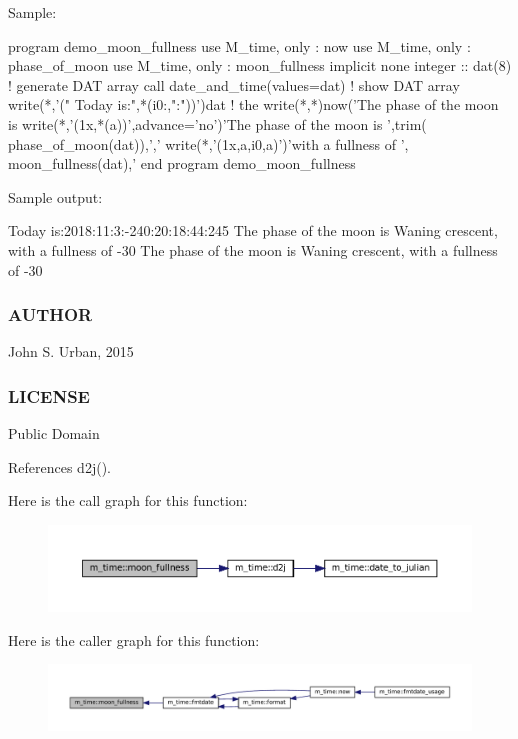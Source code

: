 \begin{DoxyVerb}Sample:

 program demo_moon_fullness
 use M_time, only : now
 use M_time, only : phase_of_moon
 use M_time, only : moon_fullness
 implicit none
 integer             :: dat(8)
    ! generate DAT array
    call date_and_time(values=dat)
    ! show DAT array
    write(*,'(" Today is:",*(i0:,":"))')dat
    ! the %
    write(*,*)now('The phase of the moon is %
    write(*,'(1x,*(a))',advance='no')'The phase of the moon is ',trim( phase_of_moon(dat)),','
    write(*,'(1x,a,i0,a)')'with a fullness of ', moon_fullness(dat),'%
 end program demo_moon_fullness

Sample output:

 Today is:2018:11:3:-240:20:18:44:245
 The phase of the moon is Waning crescent, with a fullness of -30%
 The phase of the moon is Waning crescent, with a fullness of -30%
\end{DoxyVerb}
 \subsubsection*{A\+U\+T\+H\+OR}

John S. Urban, 2015 \subsubsection*{L\+I\+C\+E\+N\+SE}

Public Domain 

References d2j().

Here is the call graph for this function\+:\nopagebreak
\begin{figure}[H]
\begin{center}
\leavevmode
\includegraphics[width=350pt]{namespacem__time_a702b39998a769b8f60070c0bec975ee2_cgraph}
\end{center}
\end{figure}
Here is the caller graph for this function\+:\nopagebreak
\begin{figure}[H]
\begin{center}
\leavevmode
\includegraphics[width=350pt]{namespacem__time_a702b39998a769b8f60070c0bec975ee2_icgraph}
\end{center}
\end{figure}
\mbox{\label{namespacem__time_ac0e0df383f424680ce59f5540e02348b}} 
